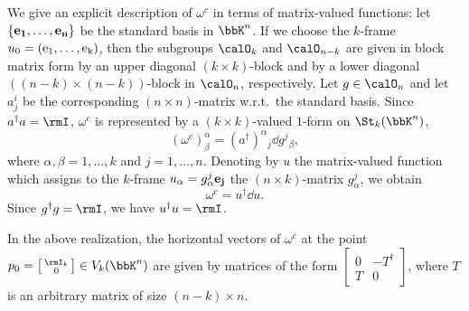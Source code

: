 \begin{example}
    We give an explicit description of $\omega^c$ in terms of matrix-valued functions: let $\{\bf{e}_1,\ldots,\bf{e}_n\}$ be the standard basis in $\bbK^n$. If we choose the $k$-frame $u_0=(\rm{e}_1,\ldots,\rm{e}_k)$, then the subgroups $\calO_k$ and $\calO_{n-k}$ are given in block matrix form by an upper diagonal $(k\times k)$-block and by a lower diagonal $((n-k)\times(n-k))$-block in $\calO_n$, respectively. Let $g\in\calO_n$ and let $a^i_j$ be the corresponding $(n\times n)$-matrix w.r.t.\ the standard basis. Since $a^\dagger a=\rmI$, $\omega^c$ is represented by a $(k\times k)$-valued $1$-form on $\St_k(\bbK^n)$,
    \[(\omega^c)^\alpha_\beta=(a^\dagger)^\alpha{}_j \dd g^j{}_\beta,\]
    where $\alpha,\beta=1,\ldots,k$ and $j=1,\ldots,n$. Denoting by $u$ the matrix-valued function which assigns to the $k$-frame $u_\alpha=g^j_\alpha \bf{e}_j$ the $(n\times k)$-matrix $g^j_\alpha$, we obtain
    \[\omega^c=u^\dagger\dd u.\]
    Since $g^\dagger g=\rmI$, we have $u^\dagger u=\rmI$.
\end{example}

\begin{rem}
    In the above realization, the horizontal vectors of $\omega^c$ at the point $p_0=\left[\begin{smallmatrix}
        \rmI_k\\0
    \end{smallmatrix}\right]\in V_k(\bbK^n)$
    are given by matrices of the form $\left[\begin{smallmatrix}
        0&-T^\dagger\\
        T&0
    \end{smallmatrix}\right]$,
    where $T$ is an arbitrary matrix of size $(n-k)\times n$.
\end{rem}

